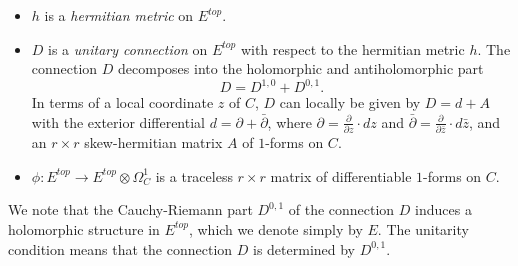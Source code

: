 \documentclass[oneside, 11pt]{amsart}
\theoremstyle{definition}
\numberwithin{equation}{subsection}
\def\tensor{\otimes}
\newcommand{\lrar}{\longrightarrow}
\begin{document}
\begin{itemize}
\item  $h$ is a \emph{hermitian metric} on $E^{top}$. 
\item  $D$ is a \emph{unitary connection} on $E^{top}$ with respect to the hermitian metric
$h$. The connection $D$ decomposes into the holomorphic and antiholomorphic part
$$
D=D^{1,0}+D^{0,1}.
$$
In terms of a local coordinate $z$ of $C$, 
$D$  can locally be given by $D = d+A$ with the exterior  differential $d=\partial+\bar{\partial}$, where $\partial=\frac{\partial}{\partial z}\cdot dz$ and $\bar{\partial}=\frac{\partial}{\partial \bar{z}} \cdot d{\bar{z}}$, and  an $r \times r$ skew-hermitian matrix $A$ of $1$-forms on $C$.


\item $\phi:E^{top}\lrar E^{top}\tensor \Omega_C^1$ is
a  traceless $r\times r$ matrix of differentiable
$1$-forms on $C$.
\end{itemize}
We note that the Cauchy-Riemann
part $D^{0,1}$ of the connection $D$ induces a 
holomorphic structure in $E^{top}$, which we
denote simply by $E$. The unitarity condition
 means that the connection $D$ is
determined by $D^{0,1}$.
\end{document}
